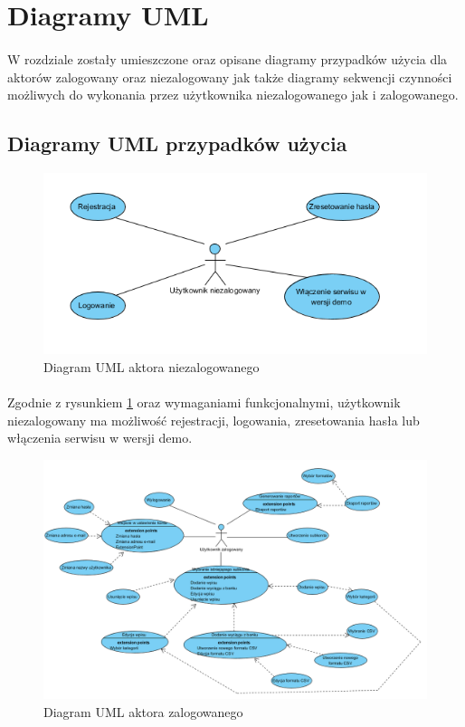 \documentclass{article}
\begin{document}
	\section{Diagramy UML}
	\paragraph*{} W rozdziale zostały umieszczone oraz opisane diagramy przypadków użycia dla aktorów zalogowany oraz niezalogowany jak także diagramy sekwencji czynności możliwych do wykonania przez użytkownika niezalogowanego jak i zalogowanego.
	\subsection{Diagramy UML przypadków użycia}
	\begin{figure}[h]
		\centering
		\includegraphics[scale=0.9]{assets/uml1.png}
		\caption[]{Diagram UML aktora niezalogowanego}
		\label{fig:niezalakt}
	\end{figure}
	\paragraph*{} Zgodnie z rysunkiem \ref{fig:niezalakt} oraz wymaganiami funkcjonalnymi, użytkownik niezalogowany ma możliwość rejestracji, logowania, zresetowania hasła lub włączenia serwisu w wersji demo.
	\begin{figure}[H]
		\hspace*{-4cm}
		\includegraphics[scale=0.75]{assets/uml2.png}
		\caption[]{Diagram UML aktora zalogowanego}
		\label{fig:zalakt}
	\end{figure}
\end{document}
